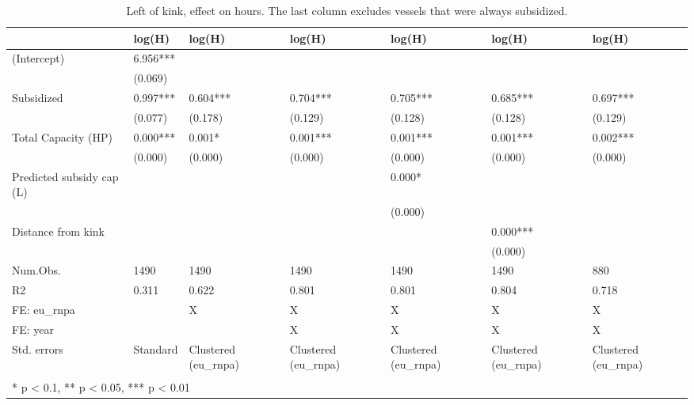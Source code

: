 \begin{table}

\caption{\label{tab:}Left of kink, effect on hours. The last column excludes vessels that were always subsidized.}
\centering
\begin{tabular}[t]{lllllll}
\toprule
  & log(H) & log(H)  & log(H)   & log(H)    & log(H)     & log(H)     \\
\midrule
(Intercept) & 6.956*** &  &  &  &  & \\
 & (0.069) &  &  &  &  & \\
Subsidized & 0.997*** & 0.604*** & 0.704*** & 0.705*** & 0.685*** & 0.697***\\
 & (0.077) & (0.178) & (0.129) & (0.128) & (0.128) & (0.129)\\
Total Capacity (HP) & 0.000*** & 0.001* & 0.001*** & 0.001*** & 0.001*** & 0.002***\\
 & (0.000) & (0.000) & (0.000) & (0.000) & (0.000) & (0.000)\\
Predicted subsidy cap (L) &  &  &  & 0.000* &  & \\
 &  &  &  & (0.000) &  & \\
Distance from kink &  &  &  &  & 0.000*** & \\
 &  &  &  &  & (0.000) & \\
\midrule
Num.Obs. & 1490 & 1490 & 1490 & 1490 & 1490 & 880\\
R2 & 0.311 & 0.622 & 0.801 & 0.801 & 0.804 & 0.718\\
FE: eu\_rnpa &  & X & X & X & X & X\\
FE: year &  &  & X & X & X & X\\
Std. errors & Standard & Clustered (eu\_rnpa) & Clustered (eu\_rnpa) & Clustered (eu\_rnpa) & Clustered (eu\_rnpa) & Clustered (eu\_rnpa)\\
\bottomrule
\multicolumn{7}{l}{\textsuperscript{} * p < 0.1, ** p < 0.05, *** p < 0.01}\\
\end{tabular}
\end{table}
